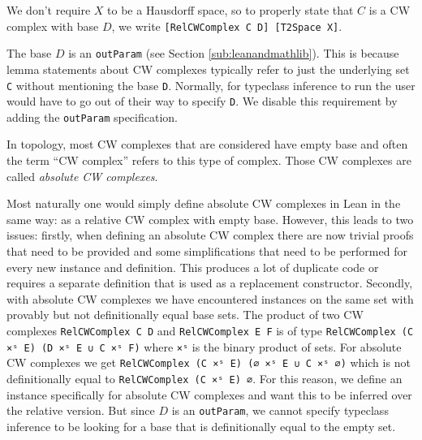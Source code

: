 We don't require $X$ to be a Hausdorff space, so to properly state that $C$ is a CW complex with base $D$, we write \lstinline|[RelCWComplex C D] [T2Space X]|.

The base $D$ is an \lstinline|outParam| (see Section \ref{sub:leanandmathlib}). 
This is because lemma statements about CW complexes typically refer to just the underlying set \lstinline|C| without mentioning the base \lstinline|D|. 
Normally, for typeclass inference to run the user would have to go out of their way to specify \lstinline|D|. 
We disable this requirement by adding the \lstinline|outParam| specification.

In topology, most CW complexes that are considered have empty base and often the term ``CW complex'' refers to this type of complex. 
Those CW complexes are called \emph{absolute CW complexes}. 

Most naturally one would simply define absolute CW complexes in Lean in the same way: as a relative CW complex with empty base.
However, this leads to two issues: 
firstly, when defining an absolute CW complex there are now trivial proofs that need to be provided and some simplifications that need to be performed for every new instance and definition. 
This produces a lot of duplicate code or requires a separate definition that is used as a replacement constructor. 
Secondly, with absolute CW complexes we have encountered instances on the same set with provably but not definitionally equal base sets. 
The product of two CW complexes \lstinline|RelCWComplex C D| and \lstinline|RelCWComplex E F| is of type \lstinline|RelCWComplex (C ×ˢ E) (D ×ˢ E ∪ C ×ˢ F)| where \lstinline|×ˢ| is the binary product of sets. 
For absolute CW complexes we get \lstinline|RelCWComplex (C ×ˢ E) (∅ ×ˢ E ∪ C ×ˢ ∅)| which is not definitionally equal to \lstinline|RelCWComplex (C ×ˢ E) ∅|.
For this reason, we define an instance specifically for absolute CW complexes and want this to be inferred over the relative version. 
But since $D$ is an \lstinline|outParam|, we cannot specify typeclass inference to be looking for a base that is definitionally equal to the empty set. 

